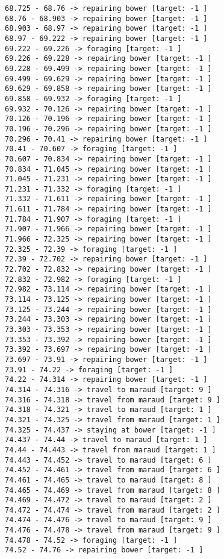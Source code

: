 \documentclass[11pt]{article}
\begin{document}
\begin{Verbatim}[commandchars=\\\{\}]
68.725 - 68.76 -> repairing bower [target: -1 ]
68.76 - 68.903 -> repairing bower [target: -1 ]
68.903 - 68.97 -> repairing bower [target: -1 ]
68.97 - 69.222 -> repairing bower [target: -1 ]
69.222 - 69.226 -> foraging [target: -1 ]
69.226 - 69.228 -> repairing bower [target: -1 ]
69.228 - 69.499 -> repairing bower [target: -1 ]
69.499 - 69.629 -> repairing bower [target: -1 ]
69.629 - 69.858 -> repairing bower [target: -1 ]
69.858 - 69.932 -> foraging [target: -1 ]
69.932 - 70.126 -> repairing bower [target: -1 ]
70.126 - 70.196 -> repairing bower [target: -1 ]
70.196 - 70.296 -> repairing bower [target: -1 ]
70.296 - 70.41 -> repairing bower [target: -1 ]
70.41 - 70.607 -> foraging [target: -1 ]
70.607 - 70.834 -> repairing bower [target: -1 ]
70.834 - 71.045 -> repairing bower [target: -1 ]
71.045 - 71.231 -> repairing bower [target: -1 ]
71.231 - 71.332 -> foraging [target: -1 ]
71.332 - 71.611 -> repairing bower [target: -1 ]
71.611 - 71.784 -> repairing bower [target: -1 ]
71.784 - 71.907 -> foraging [target: -1 ]
71.907 - 71.966 -> repairing bower [target: -1 ]
71.966 - 72.325 -> repairing bower [target: -1 ]
72.325 - 72.39 -> foraging [target: -1 ]
72.39 - 72.702 -> repairing bower [target: -1 ]
72.702 - 72.832 -> repairing bower [target: -1 ]
72.832 - 72.982 -> foraging [target: -1 ]
72.982 - 73.114 -> repairing bower [target: -1 ]
73.114 - 73.125 -> repairing bower [target: -1 ]
73.125 - 73.244 -> repairing bower [target: -1 ]
73.244 - 73.303 -> repairing bower [target: -1 ]
73.303 - 73.353 -> repairing bower [target: -1 ]
73.353 - 73.392 -> repairing bower [target: -1 ]
73.392 - 73.697 -> repairing bower [target: -1 ]
73.697 - 73.91 -> repairing bower [target: -1 ]
73.91 - 74.22 -> foraging [target: -1 ]
74.22 - 74.314 -> repairing bower [target: -1 ]
74.314 - 74.316 -> travel to maraud [target: 9 ]
74.316 - 74.318 -> travel from maraud [target: 9 ]
74.318 - 74.321 -> travel to maraud [target: 1 ]
74.321 - 74.325 -> travel from maraud [target: 1 ]
74.325 - 74.437 -> staying at bower [target: -1 ]
74.437 - 74.44 -> travel to maraud [target: 1 ]
74.44 - 74.443 -> travel from maraud [target: 1 ]
74.443 - 74.452 -> travel to maraud [target: 6 ]
74.452 - 74.461 -> travel from maraud [target: 6 ]
74.461 - 74.465 -> travel to maraud [target: 8 ]
74.465 - 74.469 -> travel from maraud [target: 8 ]
74.469 - 74.472 -> travel to maraud [target: 2 ]
74.472 - 74.474 -> travel from maraud [target: 2 ]
74.474 - 74.476 -> travel to maraud [target: 9 ]
74.476 - 74.478 -> travel from maraud [target: 9 ]
74.478 - 74.52 -> foraging [target: -1 ]
74.52 - 74.76 -> repairing bower [target: -1 ]

\end{Verbatim}
\end{document}
